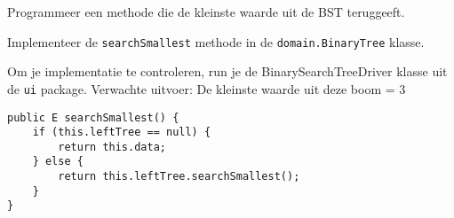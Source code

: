 \begin{oef}
\code Programmeer een methode die de kleinste waarde uit de BST teruggeeft.
\begin{oefenumerate}
	\item Implementeer de \verb=searchSmallest= methode in de \verb=domain.BinaryTree= klasse.
	\item Om je implementatie te controleren, run je de BinarySearchTreeDriver klasse uit de \verb+ui+ package. Verwachte uitvoer: De kleinste waarde uit deze boom = 3
\end{oefenumerate}
\begin{opl}
\begin{lstlisting}[caption={searchSmallest methode}, label=bstsearchsmallest]
public E searchSmallest() {
	if (this.leftTree == null) {
		return this.data;
	} else {
		return this.leftTree.searchSmallest();
	}
}
\end{lstlisting}
\end{opl}
\end{oef}



